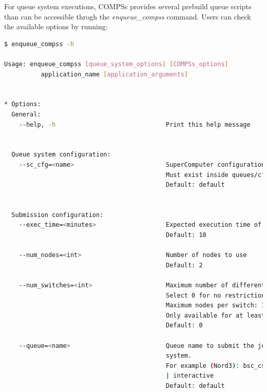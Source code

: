 For queue system executions, COMPSs provides several prebuild queue scripts than can be accessible throgh the \textit{enqueue\_compss}
command. Users can check the available options by running:
\begin{lstlisting}[language=bash]
$ enqueue_compss -h

Usage: enqueue_compss [queue_system_options] [COMPSs_options] 
          application_name [application_arguments]

          
* Options:                                                                                                          
  General:                                                                                                          
    --help, -h                              Print this help message                                                 
           
           
  Queue system configuration:                                                                                       
    --sc_cfg=<name>                         SuperComputer configuration file to use. 
                                            Must exist inside queues/cfgs/ 
                                            Default: default                                                        
             
             
  Submission configuration:                                                                                         
    --exec_time=<minutes>                   Expected execution time of the application (in minutes)                 
                                            Default: 10        
                                            
    --num_nodes=<int>                       Number of nodes to use                                                  
                                            Default: 2    
                                            
    --num_switches=<int>                    Maximum number of different switches. 
                                            Select 0 for no restrictions.     
                                            Maximum nodes per switch: 18                                            
                                            Only available for at least 4 nodes.                                    
                                            Default: 0 
                                            
    --queue=<name>                          Queue name to submit the job. Depends on the queue 
                                            system.
                                            For example (Nord3): bsc_cs | bsc_debug | debug 
                                            | interactive
                                            Default: default
                                            

\end{lstlisting}
